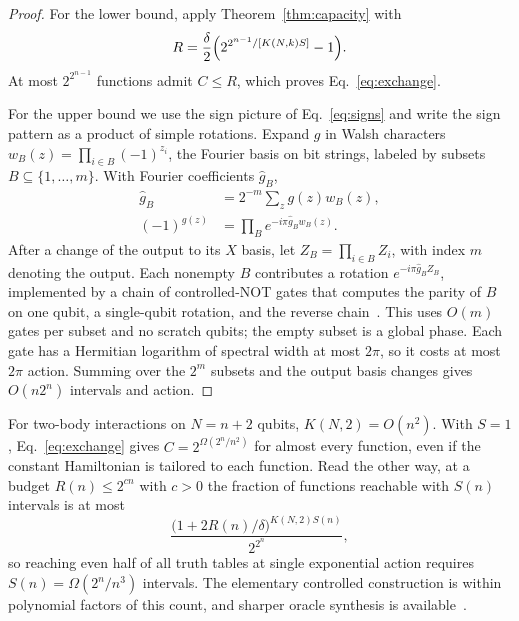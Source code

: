 \documentclass[11pt,a4paper]{article}
\begin{document}
\begin{proof}
For the lower bound, apply Theorem~\ref{thm:capacity} with
\begin{equation*}
 R=\frac{\delta}{2}\Bigl(2^{2^{n-1}/[K(N,k)S]}-1\Bigr).
\end{equation*}
At most $2^{2^{n-1}}$ functions admit $C\le R$, which proves Eq.~\eqref{eq:exchange}.

For the upper bound we use the sign picture of Eq.~\eqref{eq:signs} and write the sign pattern as a product of simple rotations. Expand $g$ in Walsh characters $w_B(z)=\prod_{i\in B}(-1)^{z_i}$, the Fourier basis on bit strings, labeled by subsets $B\subseteq\{1,\ldots,m\}$. With Fourier coefficients $\widehat g_B$,
\begin{equation}
 \begin{aligned}
 \widehat g_B&=2^{-m}\sum_zg(z)w_B(z),\\
 (-1)^{g(z)}&=\prod_Be^{-i\pi\widehat g_Bw_B(z)}.
 \end{aligned}
\end{equation}
After a change of the output to its $X$ basis, let $Z_B=\prod_{i\in B}Z_i$, with index $m$ denoting the output. Each nonempty $B$ contributes a rotation $e^{-i\pi\widehat g_BZ_B}$, implemented by a chain of controlled-NOT gates that computes the parity of $B$ on one qubit, a single-qubit rotation, and the reverse chain~\cite{Barenco1995}. This uses $O(m)$ gates per subset and no scratch qubits; the empty subset is a global phase. Each gate has a Hermitian logarithm of spectral width at most $2\pi$, so it costs at most $2\pi$ action. Summing over the $2^m$ subsets and the output basis changes gives $O(n2^n)$ intervals and action.
\end{proof}

For two-body interactions on $N=n+2$ qubits, $K(N,2)=O(n^2)$. With $S=1$, Eq.~\eqref{eq:exchange} gives $C=2^{\Omega(2^n/n^2)}$ for almost every function, even if the constant Hamiltonian is tailored to each function. Read the other way, at a budget $R(n)\le2^{cn}$ with $c>0$ the fraction of functions reachable with $S(n)$ intervals is at most
\begin{equation}
 \frac{\bigl(1+2R(n)/\delta\bigr)^{K(N,2)S(n)}}{2^{2^n}},
\end{equation}
so reaching even half of all truth tables at single exponential action requires $S(n)=\Omega(2^n/n^3)$ intervals. The elementary controlled construction is within polynomial factors of this count, and sharper oracle synthesis is available~\cite{Nie2026}.
\end{document}
